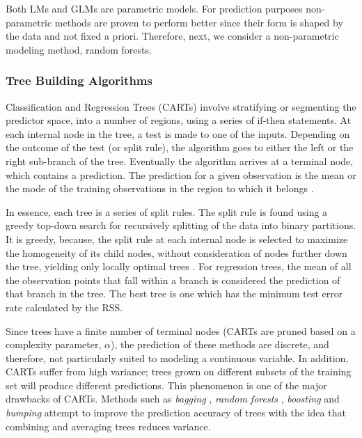 Both LMs and GLMs are parametric models. For prediction purposes non-parametric methods are proven to perform better since their form is shaped by the data and not fixed a priori. Therefore, next, we consider a non-parametric modeling method, random forests. 

\subsubsection*{Tree Building Algorithms} 
Classification and Regression Trees (CARTs) involve stratifying or segmenting the predictor space, into a number of regions, using a series of if-then statements. At each internal node in the tree, a test is made to one of the inputs. Depending on the outcome of the test (or split rule), the algorithm goes to either the left or the right sub-branch of the tree. Eventually the algorithm arrives at a terminal node, which contains a prediction. The prediction for a given observation is the mean or the mode of the training observations in the region to which it belongs \cite{breiman1984classification}. 

 In essence, each tree is a series of split rules. The split rule is found using a greedy top-down search for recursively splitting of the data into binary partitions. It is greedy, because, the split rule at each internal node is selected to maximize the homogeneity of its child nodes, without consideration of nodes further down the tree, yielding only locally optimal trees \cite{grubinger2011evtree}. For regression trees, the mean of all the observation points that fall within a branch is considered the prediction of that branch in the tree. The best tree is one which has the minimum test error rate calculated by the RSS. 

Since trees have a finite number of terminal nodes (CARTs are pruned based on a complexity parameter, $\alpha$), the prediction of these methods are discrete, and therefore, not particularly suited to modeling a continuous variable. In addition, CARTs suffer from high variance; trees grown on different subsets of the training set will produce different predictions. This phenomenon is one of the major drawbacks of CARTs. Methods such as \textit{bagging} \cite{breiman1996bagging}, \textit{random forests} \cite{breiman2001random}, \textit{boosting} \cite{friedman2001greedy} and \textit{bumping} \cite{grubinger2010regression} attempt to improve the prediction accuracy of trees with the idea that combining and averaging trees reduces variance. 

